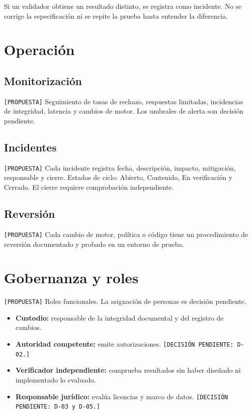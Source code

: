 \documentclass[12pt]{article}
\begin{document}
Si un validador obtiene un resultado distinto, se registra como incidente.
No se corrige la especificación ni se repite la prueba hasta entender la
diferencia.

\section{Operación}

\subsection{Monitorización}

\texttt{[PROPUESTA]} Seguimiento de tasas de rechazo, respuestas limitadas,
incidencias de integridad, latencia y cambios de motor. Los umbrales de
alerta son decisión pendiente.

\subsection{Incidentes}

\texttt{[PROPUESTA]} Cada incidente registra fecha, descripción, impacto,
mitigación, responsable y cierre. Estados de ciclo: Abierto, Contenido, En
verificación y Cerrado. El cierre requiere comprobación independiente.

\subsection{Reversión}

\texttt{[PROPUESTA]} Cada cambio de motor, política o código tiene un
procedimiento de reversión documentado y probado en un entorno de prueba.

\section{Gobernanza y roles}

\texttt{[PROPUESTA]} Roles funcionales. La asignación de personas es decisión pendiente.

\begin{itemize}
    \item \textbf{Custodio:} responsable de la integridad documental y del registro de cambios.
    \item \textbf{Autoridad competente:} emite autorizaciones. \texttt{[DECISIÓN PENDIENTE: D-02.]}
    \item \textbf{Verificador independiente:} comprueba resultados sin haber diseñado ni implementado lo evaluado.
    \item \textbf{Responsable jurídico:} evalúa licencias y marco de datos. \texttt{[DECISIÓN PENDIENTE: D-03 y D-05.]}
\end{itemize}
\end{document}
